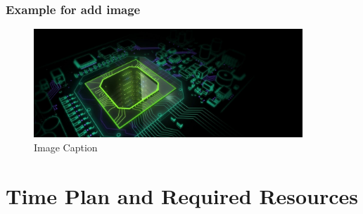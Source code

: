 \subsubsection{Example for add image}
\begin{figure}[H]
	\begin{center}
		\includegraphics[width=0.9\textwidth]{01_chapters/01/figs/exsample.jpg}
	\end{center}
	\caption{Image Caption}
\end{figure}



\section{Time Plan and Required Resources}




